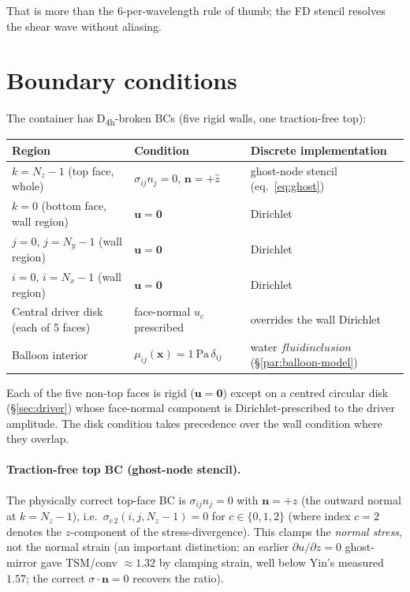 \documentclass[11pt,letterpaper]{article}
\newcommand{\vect}[1]{\boldsymbol{#1}}
\begin{document}
That is more than the 6-per-wavelength rule of thumb; the FD
stencil resolves the shear wave without aliasing.

\section{Boundary conditions}
\label{sec:bcs}

The container has D\textsubscript{4h}-broken BCs (five rigid walls,
one traction-free top):

\begin{center}
\begin{tabular}{lll}
\toprule
Region & Condition & Discrete implementation \\
\midrule
$k = N_z-1$ (top face, whole)          & $\sigma_{ij} n_j = 0$, $\vect n = +\hat z$ & ghost-node stencil (eq.~\ref{eq:ghost}) \\
$k = 0$ (bottom face, wall region)     & $\vect u = \vect 0$ & Dirichlet \\
$j = 0$, $j = N_y-1$ (wall region)     & $\vect u = \vect 0$ & Dirichlet \\
$i = 0$, $i = N_x-1$ (wall region)     & $\vect u = \vect 0$ & Dirichlet \\
Central driver disk (each of 5 faces)  & face-normal $u_c$ prescribed & overrides the wall Dirichlet \\
Balloon interior         & $\mu_{ij}(\vect x) = \SI{1}{\pascal}\,\delta_{ij}$ & water \(fluid inclusion\) (\S\ref{par:balloon-model}) \\
\bottomrule
\end{tabular}
\end{center}

Each of the five non-top faces is rigid ($\vect u = \vect 0$) except
on a centred circular disk (\S\ref{sec:driver}) whose face-normal
component is Dirichlet-prescribed to the driver amplitude. The disk
condition takes precedence over the wall condition where they
overlap.

\paragraph{Traction-free top BC (ghost-node stencil).}
The physically correct top-face BC is $\sigma_{ij} n_j = 0$ with
$\vect n = +\hat z$ (the outward normal at $k=N_z-1$), i.e.\
$\sigma_{c\,2}(i,j,N_z{-}1) = 0$ for $c \in \{0,1,2\}$ (where index $c=2$
denotes the $z$-component of the stress-divergence).
This clamps the \emph{normal stress}, not the normal strain (an
important distinction: an earlier $\partial u/\partial z = 0$
ghost-mirror gave TSM/conv $\approx 1.32$ by clamping strain, well
below Yin's measured $1.57$; the correct $\sigma\cdot\vect n = 0$
recovers the ratio).
\end{document}
